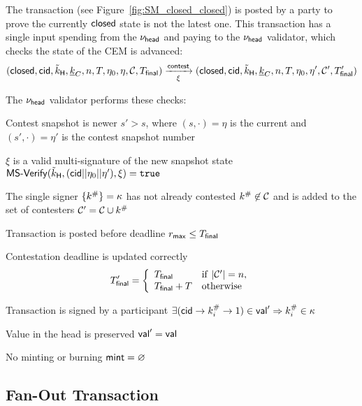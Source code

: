

The \mtxContest{} transaction (see Figure~\ref{fig:SM_closed_closed}) is posted
by a party to prove the currently $\mathsf{closed}$ state is not the latest one. This
transaction has a single input spending from the $\nu_\mathsf{head}$ and paying to the
$\nu_\mathsf{head}$ validator, which checks the state of the CEM is advanced:
\[
  (\mathsf{closed},\mathsf{cid},\tilde{k}_{\mathsf{H}},\underline{k}_C,n,T,\eta_0,\eta,\mathcal{C},T_{\mathsf{final}}) \xrightarrow[\xi]{\mathsf{contest}} (\mathsf{closed},\mathsf{cid},\tilde{k}_{\mathsf{H}},\underline{k}_C,n,T,\eta_0,\eta',\mathcal{C}',T_{\mathsf{final}}')
\]

\noindent The $\nu_\mathsf{head}$ validator performs these checks:
\begin{menumerate}
  \item Contest snapshot is newer $s' > s$, where $(s, \cdot) = \eta$ is the current and $(s', \cdot) = \eta'$ is the contest snapshot number
  \item $\xi$ is a valid multi-signature of the new snapshot state
  $\mathsf{MS\textsf{-}{}Verify}(\tilde{k}_{\mathsf{H}},(\mathsf{cid} || \eta_{0} || \eta'),\xi) = \mathtt{true}$
  \item The single signer $\{k^{\#}\} = \kappa$ has not already contested $k^{\#} \not\in \mathcal{C}$ and is added to the set of contesters $\mathcal{C}' = \mathcal{C} \cup k^{\#}$
  \item Transaction is posted before deadline $r_{\mathsf{max}} \leq T_{\mathsf{final}}$
  \item Contestation deadline is updated correctly
     \[
       T_{\mathsf{final}}' = \left\{\begin{array}{ll}
                           T_{\mathsf{final}}     & \mathrm{if} ~ |\mathcal{C}'| = n, \\
                           T_{\mathsf{final}} + T & \mathrm{otherwise}
                         \end{array}\right.
    \]
  \item Transaction is signed by a participant $\exists (\mathsf{cid} \rightarrow k^{\#}_{i} \rightarrow 1) \in \mathsf{val}' \Rightarrow k^{\#}_{i} \in \kappa$
  \item Value in the head is preserved $\mathsf{val}' = \mathsf{val}$
  \item No minting or burning $\mathsf{mint} = \varnothing$
\end{menumerate}

\subsection{Fan-Out Transaction}



